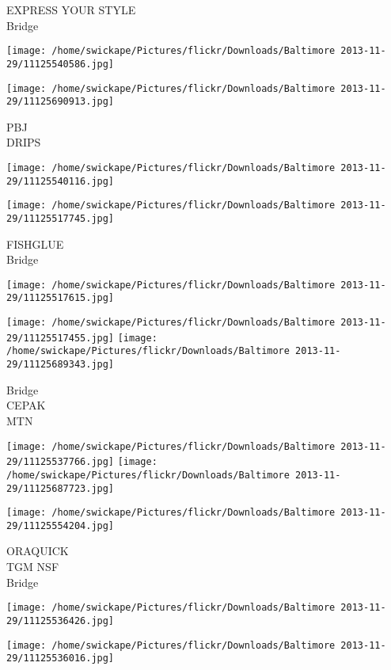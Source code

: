 \documentclass[10pt,letterpaper]{article}
\begin{document}
EXPRESS YOUR STYLE\\
Bridge
\pagebreak

\texttt{[image: /home/swickape/Pictures/flickr/Downloads/Baltimore 2013-11-29/11125540586.jpg]}

\vspace{0.25in}
\texttt{[image: /home/swickape/Pictures/flickr/Downloads/Baltimore 2013-11-29/11125690913.jpg]}

PBJ\\
DRIPS
\pagebreak

\texttt{[image: /home/swickape/Pictures/flickr/Downloads/Baltimore 2013-11-29/11125540116.jpg]}

\vspace{0.25in}
\texttt{[image: /home/swickape/Pictures/flickr/Downloads/Baltimore 2013-11-29/11125517745.jpg]}

FISHGLUE\\
Bridge
\pagebreak

\texttt{[image: /home/swickape/Pictures/flickr/Downloads/Baltimore 2013-11-29/11125517615.jpg]}

\vspace{0.25in}
\texttt{[image: /home/swickape/Pictures/flickr/Downloads/Baltimore 2013-11-29/11125517455.jpg]}
\texttt{[image: /home/swickape/Pictures/flickr/Downloads/Baltimore 2013-11-29/11125689343.jpg]}

Bridge\\
CEPAK\\
MTN
\pagebreak

\texttt{[image: /home/swickape/Pictures/flickr/Downloads/Baltimore 2013-11-29/11125537766.jpg]}
\texttt{[image: /home/swickape/Pictures/flickr/Downloads/Baltimore 2013-11-29/11125687723.jpg]}

\texttt{[image: /home/swickape/Pictures/flickr/Downloads/Baltimore 2013-11-29/11125554204.jpg]}

ORAQUICK\\
TGM NSF\\
Bridge
\pagebreak

\texttt{[image: /home/swickape/Pictures/flickr/Downloads/Baltimore 2013-11-29/11125536426.jpg]}

\vspace{0.25in}
\texttt{[image: /home/swickape/Pictures/flickr/Downloads/Baltimore 2013-11-29/11125536016.jpg]}
\end{document}
